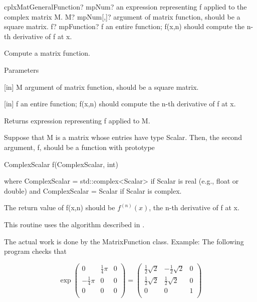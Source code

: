 \vspace{0.6cm}
\begin{mpFunctionsExtract}
	\mpFunctionTwo
	{cplxMatGeneralFunction? mpNum? an expression representing f applied to the complex matrix M.}
	{M? mpNum[,]? argument of matrix function, should be a square matrix.}
	{f? mpFunction? f an entire function; f(x,n) should compute the n-th derivative of f at x.}
\end{mpFunctionsExtract}

%

\vspace{0.3cm}
Compute a matrix function.

Parameters

[in] M argument of matrix function, should be a square matrix. 

[in] f an entire function; f(x,n) should compute the n-th derivative of f at x.  

Returns expression representing f applied to M.

Suppose that M is a matrix whose entries have type Scalar. Then, the second argument, f, should be a function with prototype 

ComplexScalar f(ComplexScalar, int) 

where ComplexScalar = std::complex<Scalar> if Scalar is real (e.g., float or double) and ComplexScalar = Scalar if Scalar is complex. 

The return value of f(x,n) should be $f^{(n)}(x)$, the n-th derivative of f at x.

This routine uses the algorithm described in \cite{Davies_2003}.


The actual work is done by the MatrixFunction class.
Example: The following program checks that 


\begin{equation} 
\exp
\begin{pmatrix}
0 & \tfrac{1}{4}\pi & 0 \\
-\tfrac{1}{4}\pi  & 0 & 0 \\
0 & 0 & 0 \\
\end{pmatrix}
=
\begin{pmatrix}
\tfrac{1}{2}\sqrt{2} & -\tfrac{1}{2}\sqrt{2} & 0 \\
\tfrac{1}{2}\sqrt{2} & \tfrac{1}{2}\sqrt{2} & 0 \\
0 & 0 & 1 \\
\end{pmatrix}
\end{equation} 



